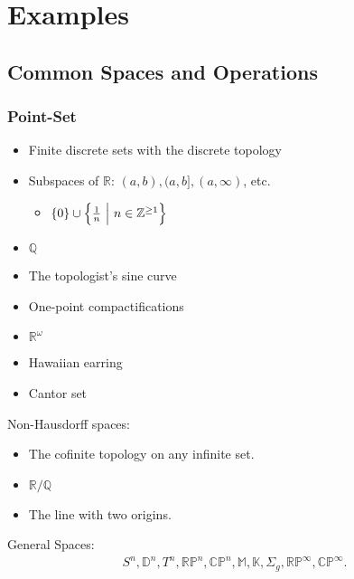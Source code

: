\hypertarget{examples}{%
\section{Examples}\label{examples}}

\hypertarget{common-spaces-and-operations}{%
\subsection{Common Spaces and
Operations}\label{common-spaces-and-operations}}

\hypertarget{point-set}{%
\subsubsection{Point-Set}\label{point-set}}

\begin{itemize}
\tightlist
\item
  Finite discrete sets with the discrete topology
\item
  Subspaces of \({\mathbb{R}}\): \((a, b), (a, b], (a, \infty)\), etc.

  \begin{itemize}
  \tightlist
  \item
    \(\left\{{0}\right\} \cup\left\{{{1 \over n}{~\mathrel{\Big|}~}n\in {\mathbb{Z}}^{\geq 1}}\right\}\)
  \end{itemize}
\item
  \({\mathbb{Q}}\)
\item
  The topologist's sine curve
\item
  One-point compactifications
\item
  \({\mathbb{R}}^\omega\)
\item
  Hawaiian earring
\item
  Cantor set
\end{itemize}

Non-Hausdorff spaces:

\begin{itemize}
\tightlist
\item
  The cofinite topology on any infinite set.
\item
  \({\mathbb{R}}/{\mathbb{Q}}\)
\item
  The line with two origins.
\end{itemize}

General Spaces:
\begin{align*} S^n, {\mathbb{D}}^n, T^n, {\mathbb{RP}}^n, {\mathbb{CP}}^n, \mathbb{M}, \mathbb{K}, \Sigma_g, {\mathbb{RP}}^\infty, {\mathbb{CP}}^\infty .\end{align*}

